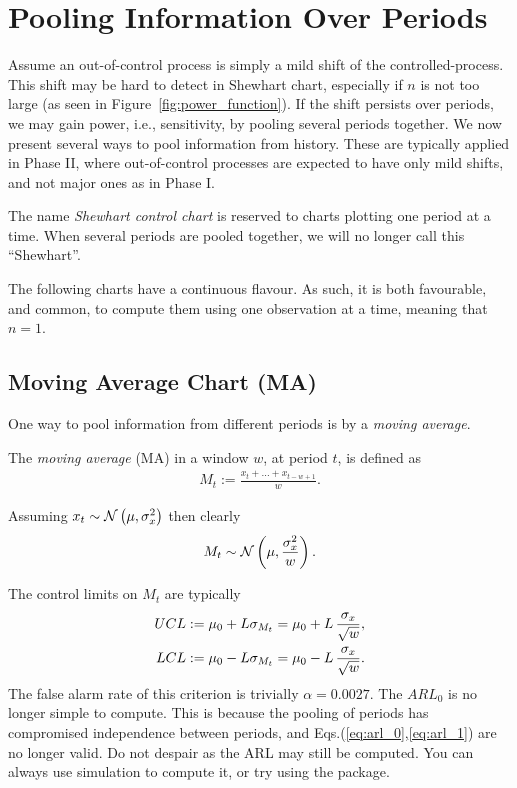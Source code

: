 \section{Pooling Information Over Periods}
\label{sec:running_windows}

Assume an out-of-control process is simply a mild shift of the controlled-process.
This shift may be hard to detect in Shewhart chart, especially if $n$ is not too large (as seen in Figure~\ref{fig:power_function}).  
If the shift persists over periods, we may gain power, i.e., sensitivity, by pooling several periods together. 
We now present several ways to pool information from history. These are typically applied in Phase II, where out-of-control processes are expected to have only mild shifts, and not major ones as in Phase I. 

\begin{remark}
The name \emph{Shewhart control chart} is reserved to charts plotting one period at a time. 
When several periods are pooled together, we will no longer call this  ``Shewhart''.
\end{remark}

\begin{remark}
The following charts have a continuous flavour. As such, it is both favourable, and common, to compute them using one observation at a time, meaning that $n=1$. 
\end{remark}





\subsection{Moving Average Chart (MA)}

One way to pool information from different periods is by a \emph{moving average}.
\begin{definition}[MA]
The \emph{moving average} (MA) in a window $w$, at period $t$, is defined as
\begin{align}
	M_t:= \frac{x_t+\dots+x_{t-w+1}}{w}.
\end{align}
\end{definition}
Assuming $x_t \sim \mathcal{N}\left(\mu, \sigma_x^2\right)$ then clearly 
\begin{align}
	M_t \sim \mathcal{N}\left(\mu, \frac{\sigma_x^2}{w}\right).
\end{align}

The control limits on $M_t$ are typically
\begin{align}
	UCL &:= \mu_0 + L \sigma_{M_t}= \mu_0 + L \, \frac{\sigma_x}{\sqrt{w}}, \\
	LCL &:= \mu_0 - L \sigma_{M_t}= \mu_0 - L \, \frac{\sigma_x}{\sqrt{w}}.
\end{align}
The false alarm rate of this criterion is trivially $\alpha=0.0027$. 
The $ARL_0$ is no longer simple to compute. 
This is because the pooling of periods has compromised independence between periods, and Eqs.(\ref{eq:arl_0},\ref{eq:arl_1}) are no longer valid. 
Do not despair as the ARL may still be computed. 
You can always use simulation to compute it, or try using the  \R package.


